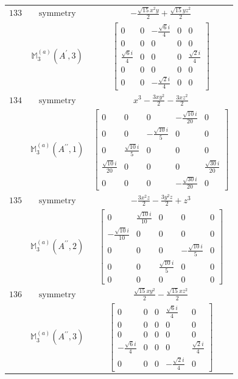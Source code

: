 \documentclass[fleqn,8pt,landscape]{jsarticle}
\begin{document}
\begin{longtable}{ccc}
$ 133 $ & $ \text{symmetry} $ & $ - \frac{\sqrt{15} x^{2} y}{2} + \frac{\sqrt{15} y z^{2}}{2} $ \\
$  $ & $ \mathbb{M}_{3}^{(a)}(A^{\prime},3) $ & $ \begin{bmatrix} 0 & 0 & - \frac{\sqrt{6} i}{4} & 0 & 0 \\ 0 & 0 & 0 & 0 & 0 \\ \frac{\sqrt{6} i}{4} & 0 & 0 & 0 & \frac{\sqrt{2} i}{4} \\ 0 & 0 & 0 & 0 & 0 \\ 0 & 0 & - \frac{\sqrt{2} i}{4} & 0 & 0 \end{bmatrix} $ \\ \hline
$ 134 $ & $ \text{symmetry} $ & $ x^{3} - \frac{3 x y^{2}}{2} - \frac{3 x z^{2}}{2} $ \\
$  $ & $ \mathbb{M}_{3}^{(a)}(A^{\prime\prime},1) $ & $ \begin{bmatrix} 0 & 0 & 0 & - \frac{\sqrt{10} i}{20} & 0 \\ 0 & 0 & - \frac{\sqrt{10} i}{5} & 0 & 0 \\ 0 & \frac{\sqrt{10} i}{5} & 0 & 0 & 0 \\ \frac{\sqrt{10} i}{20} & 0 & 0 & 0 & \frac{\sqrt{30} i}{20} \\ 0 & 0 & 0 & - \frac{\sqrt{30} i}{20} & 0 \end{bmatrix} $ \\ \hline
$ 135 $ & $ \text{symmetry} $ & $ - \frac{3 x^{2} z}{2} - \frac{3 y^{2} z}{2} + z^{3} $ \\
$  $ & $ \mathbb{M}_{3}^{(a)}(A^{\prime\prime},2) $ & $ \begin{bmatrix} 0 & \frac{\sqrt{10} i}{10} & 0 & 0 & 0 \\ - \frac{\sqrt{10} i}{10} & 0 & 0 & 0 & 0 \\ 0 & 0 & 0 & - \frac{\sqrt{10} i}{5} & 0 \\ 0 & 0 & \frac{\sqrt{10} i}{5} & 0 & 0 \\ 0 & 0 & 0 & 0 & 0 \end{bmatrix} $ \\ \hline
$ 136 $ & $ \text{symmetry} $ & $ \frac{\sqrt{15} x y^{2}}{2} - \frac{\sqrt{15} x z^{2}}{2} $ \\
$  $ & $ \mathbb{M}_{3}^{(a)}(A^{\prime\prime},3) $ & $ \begin{bmatrix} 0 & 0 & 0 & \frac{\sqrt{6} i}{4} & 0 \\ 0 & 0 & 0 & 0 & 0 \\ 0 & 0 & 0 & 0 & 0 \\ - \frac{\sqrt{6} i}{4} & 0 & 0 & 0 & \frac{\sqrt{2} i}{4} \\ 0 & 0 & 0 & - \frac{\sqrt{2} i}{4} & 0 \end{bmatrix} $ \\ \hline

\end{longtable}
\end{document}
